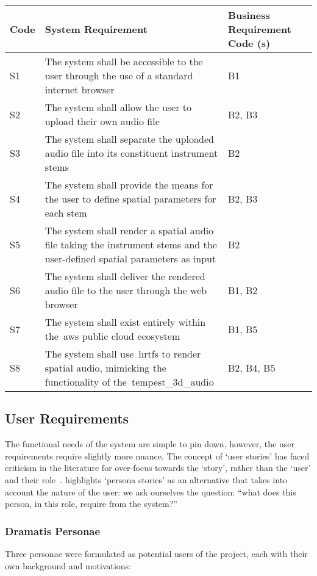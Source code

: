 \begin{tabularx}{\textwidth}{szs}
    \caption{System Requirements}\label{tab:system-requirements}\\
    \toprule
    \textbf{Code} & \textbf{System Requirement} & \textbf{Business Requirement Code (s)} \\\midrule
    S1 & The system shall be accessible to the user through the use of a standard internet browser & B1 \\\midrule
    S2 & The system shall allow the user to upload their own audio file & B2, B3 \\\midrule
    S3 & The system shall separate the uploaded audio file into its constituent instrument stems & B2 \\\midrule
    S4 & The system shall provide the means for the user to define spatial parameters for each stem & B2, B3 \\\midrule
    S5 & The system shall render a spatial audio file taking the instrument stems and the user-defined spatial parameters as input & B2 \\\midrule
    S6 & The system shall deliver the rendered audio file to the user through the web browser & B1, B2 \\\midrule
    S7 & The system shall exist entirely within the~\gls{aws} public cloud ecosystem & B1, B5 \\\midrule
    S8 & The system shall use~\glspl{hrtf} to render spatial audio, mimicking the functionality of the~\gls{tempest_3d_audio} & B2, B4, B5 \\\bottomrule
\end{tabularx}

\subsection{User Requirements}\label{subsec:user-requirements}
The functional needs of the system are simple to pin down, however, the user requirements require slightly more nuance.
The concept of `user stories' has faced criticism in the literature for over-focus towards the `story', rather than the `user' and their role~\citep{hudson2013user}.
\citet{hudson2013user} highlights `persona stories' as an alternative that takes into account the nature of the user: we ask ourselves the question: ``what does this person, in this role, require from the system?''

\subsubsection{Dramatis Personae}
Three personae were formulated as potential users of the project, each with their own background and motivations:

